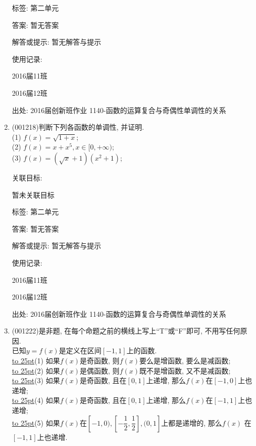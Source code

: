 \documentclass[10pt,a4paper]{article}
\newcommand{\blank}[1]{\underline{\hbox to #1pt{}}}
\begin{document}
\begin{enumerate}[1.]
标签: 第二单元

答案: 暂无答案

解答或提示: 暂无解答与提示

使用记录:

2016届11班								

2016届12班								


出处: 2016届创新班作业	1140-函数的运算复合与奇偶性单调性的关系
\item { (001218)}判断下列各函数的单调性, 并证明.\\ 
(1) $f(x)=\sqrt{1+x}$;\\ 
(2) $f(x)=x+x^5,x\in[0,+\infty)$;\\ 
(3) $f(x)=(\sqrt{x}+1)(x^2+1)$;


关联目标:

暂未关联目标



标签: 第二单元

答案: 暂无答案

解答或提示: 暂无解答与提示

使用记录:

2016届11班			

2016届12班			


出处: 2016届创新班作业	1140-函数的运算复合与奇偶性单调性的关系
\item { (001222)}是非题, 在每个命题之前的横线上写上``T''或``F''即可, 不用写任何原因.\\ 
已知$y=f(x)$是定义在区间$[-1,1]$上的函数.\\ 
\blank{25}(1) 如果$f(x)$是奇函数, 则$f(x)$要么是增函数, 要么是减函数;\\ 
\blank{25}(2) 如果$f(x)$是偶函数, 则$f(x)$既不是增函数, 又不是减函数;\\ 
\blank{25}(3) 如果$f(x)$是奇函数, 且在$[0,1]$上递增, 那么$f(x)$在$[-1,0]$上也递增;\\ 
\blank{25}(4) 如果$f(x)$是奇函数, 且在$[0,1]$上递增, 那么$f(x)$在$[-1,1]$上也递增;\\ 
\blank{25}(5) 如果$f(x)$在$[-1,0),[-\dfrac{1}{2},\dfrac{1}{2}],(0,1]$上都是递增的, 那么$f(x)$ 在$[-1,1]$上也递增.



\end{enumerate}
\end{document}
